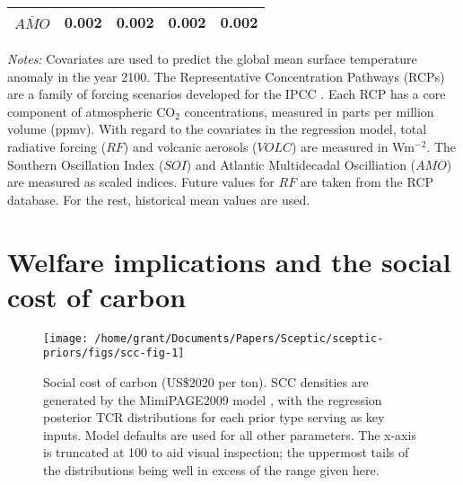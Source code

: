 \documentclass[
]{article}
\begin{document}
\begin{table}[h]
\begin{threeparttable}
\begin{tabularx}{.75\textwidth}{@{\extracolsep{1pt}} X A A A A }
            \\[-1.8ex] 
            $\overline{AMO}$                                                                    &\text{-}0.002 &\text{-}0.002   &\text{-}0.002  &\text{-}0.002  \\
            \bottomrule
        \end{tabularx}
        \begin{tablenotes}
            \footnotesize
            \item \textit{Notes:} Covariates are used to predict the global mean surface temperature anomaly in the year 2100. The Representative Concentration Pathways (RCPs) are a family of forcing scenarios developed for the IPCC \cite{van2011rcp}. Each RCP has a core component of atmospheric CO$_2$ concentrations, measured in parts per million volume (ppmv). With regard to the covariates in the regression model, total radiative forcing ($RF$) and volcanic aerosols ($VOLC$) are measured in Wm$^{-2}$. The Southern Oscillation Index ($SOI$) and Atlantic Multidecadal Oscilliation ($AMO$) are measured as scaled indices. Future values for $RF$ are taken from the RCP database. For the rest, historical mean values are used.
        \end{tablenotes}
    \end{threeparttable} 
    \label{tab:covariate}
\end{table}

\newpage
\pagebreak

\hypertarget{welfare-implications-and-the-social-cost-of-carbon}{%
\section{Welfare implications and the social cost of
carbon}\label{welfare-implications-and-the-social-cost-of-carbon}}

\begin{figure}[h]

{\centering \texttt{[image: /home/grant/Documents/Papers/Sceptic/sceptic-priors/figs/scc-fig-1]} 

}

\caption{Social cost of carbon (US\$2020 per ton). SCC densities are generated by the MimiPAGE2009 model \citep{moore2018mimipage}, with the regression posterior TCR distributions for each prior type serving as key inputs. Model defaults are used for all other parameters. The x-axis is truncated at 100 to aid visual inspection; the uppermost tails of the distributions being well in excess of the range given here.}\label{fig:scc-fig}
\end{figure}

\newpage

  
\end{document}
